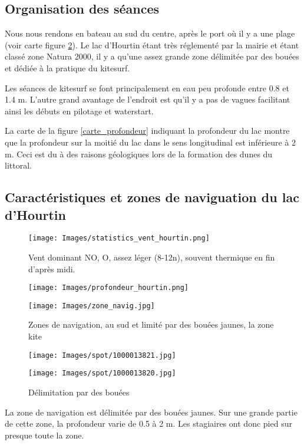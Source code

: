 \documentclass[11pt,a4paper]{report}
\begin{document}
\subsection{Organisation des séances}
Nous nous rendons en bateau au sud du centre, après le port o\`u
il y a une plage (voir carte figure \ref{zones_nav}). Le lac 
d'Hourtin étant très réglementé par la mairie et étant classé
zone Natura 2000\cite{natura2000}, 
il y a qu'une assez grande zone délimitée par des bouées et 
dédiée à la pratique du kitesurf.

Les séances de kitesurf se font principalement en eau peu profonde
entre 0.8 et 1.4 m. L'autre grand avantage de l'endroit est
qu'il y a pas de vagues facilitant ainsi les débuts en pilotage
et waterstart.

La carte de la figure \ref{carte_profondeur} indiquant la 
profondeur du lac montre que la profondeur sur la moitié du lac
dans le sens longitudinal est inférieure à 2 m. 
Ceci est du à des raisons géologiques lors de la
formation des dunes du littoral.

\subsection{Caractéristiques  et zones de naviguation du lac d'Hourtin}
\begin{figure}
\centering
\texttt{[image: Images/statistics\_vent\_hourtin.png]} 
\caption{Vent dominant NO, O, assez léger (8-12n), 
souvent thermique en fin d'après midi.\label{vent_stats}}
\end{figure}

\begin{figure}
\begin{minipage}{0.4\textwidth}
\texttt{[image: Images/profondeur\_hourtin.png]} 
\caption{Profondeur du lac d'Hourtin, la profondeur est inférieure
à 2m sur la moitié est du lac (limite 2 m en vert)\label{carte_profondeur}}
\end{minipage}
\hfill
\begin{minipage}{0.4\textwidth}
\texttt{[image: Images/zone\_navig.jpg]} 
\caption{Zones de navigation, au sud et limité par des bouées jaunes,
 la zone kite\label{zones_nav}}
 \end{minipage}
\end{figure}

\begin{figure}
\begin{minipage}{0.4\textwidth}
\texttt{[image: Images/spot/1000013821.jpg]} 
\caption{Zone de pratique}
\end{minipage}
\hfill
\begin{minipage}{0.4\textwidth}
\texttt{[image: Images/spot/1000013820.jpg]} 
\caption{Délimitation par des bouées}
\end{minipage}
\end{figure}
La zone de navigation est délimitée par des bouées jaunes.
Sur une grande partie de cette zone, la profondeur varie de 0.5 à 2 m.
Les stagiaires ont donc pied sur presque toute la zone.
\end{document}
